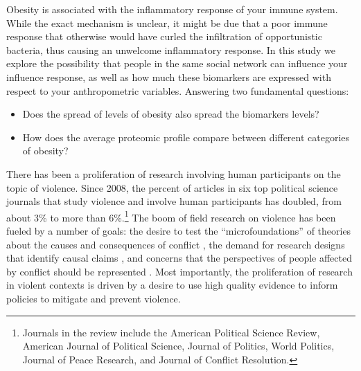 \documentclass[
  journal=psrm,
  manuscript=research-note,  %
  year=2022,
  volume=6,
]{cup-journal}
\begin{document}
Obesity is associated with the inflammatory response of your immune system. While the exact mechanism is unclear, it might be due that a poor immune response that otherwise would have curled the infiltration of opportunistic bacteria, thus causing an unwelcome inflammatory response. In this study we explore the possibility that people in the same social network can influence your influence response, as well as how much these biomarkers are expressed with respect to your anthropometric variables. Answering two fundamental questions:\\

\begin{itemize}

  \item Does the spread of levels of obesity also spread the biomarkers levels?\\
  
  \item How does the average proteomic profile compare between different categories of obesity?
  
\end{itemize}




There has been a proliferation of research involving human participants on the topic of violence. Since 2008, the percent of articles in six top political science journals that study violence and involve human participants has doubled, from about 3\% to more than 6\%.\footnote{Journals in the review include the American Political Science Review, American Journal of Political Science, Journal of Politics, World Politics, Journal of Peace Research, and Journal of Conflict Resolution.} The boom of field research on violence has been fueled by a number of goals: the desire to test the ``microfoundations'' of theories about the causes and consequences of conflict \citep{kertzer2017microfoundations}, the demand for research designs that identify causal claims \citep{gerber2004illusion}, and concerns that the perspectives of people affected by conflict should be represented \citep{pearlman2017crossed}. Most importantly, the proliferation of research in violent contexts is driven by a desire to use high quality evidence to inform policies to mitigate and prevent violence. 
\end{document}
